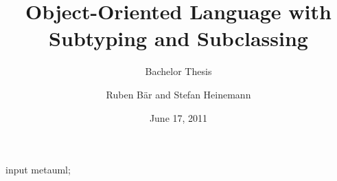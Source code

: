 \begin{empfile}
\begin{empcmds}
input metauml;
\end{empcmds}


\title{Object-Oriented Language with Subtyping and Subclassing}
\subtitle{Bachelor Thesis}

\author{Ruben Bär and Stefan Heinemann}

\date{June 17, 2011}



\maketitle

\listoftodos





\thispagestyle{empty}

\setcounter{tocdepth}{1}
\tableofcontents

\newpage
{}

\renewcommand*{\partpagestyle}{empty}

















\end{empfile}

